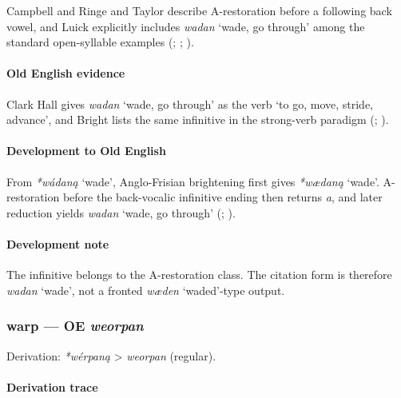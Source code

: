 \documentclass[
  british,
  a4paper,
]{article}
\providecommand{\Recon}[1]{\emph{*#1}}
\begin{document}
Campbell and Ringe and Taylor describe A-restoration before a following
back vowel, and Luick explicitly includes {\emph{wadan}} `wade, go
through' among the standard open-syllable examples
(;
;
).

\paragraph{Old English evidence}\label{old-english-evidence-64}

Clark Hall gives {\emph{wadan}} `wade, go through' as the verb `to go,
move, stride, advance', and Bright lists the same infinitive in the
strong-verb paradigm (;
).

\paragraph{Development to Old
English}\label{development-to-old-english-64}

From \Recon{wádaną} `wade', Anglo-Frisian brightening first gives
\Recon{wædaną} `wade'. A-restoration before the back-vocalic infinitive
ending then returns \emph{a}, and later reduction yields {\emph{wadan}}
`wade, go through' (;
).

\paragraph{Development note}\label{development-note-2}

The infinitive belongs to the A-restoration class. The citation form is
therefore \emph{wadan} `wade', not a fronted \emph{wæden} `waded'-type
output.

\subsubsection{\texorpdfstring{warp --- OE
\emph{weorpan}}{warp --- OE weorpan}}\label{warp-oe-weorpan}

Derivation: \emph{*wérpaną} \textgreater{} \emph{weorpan} (regular).

\paragraph{Derivation trace}\label{derivation-trace-69}
\end{document}
